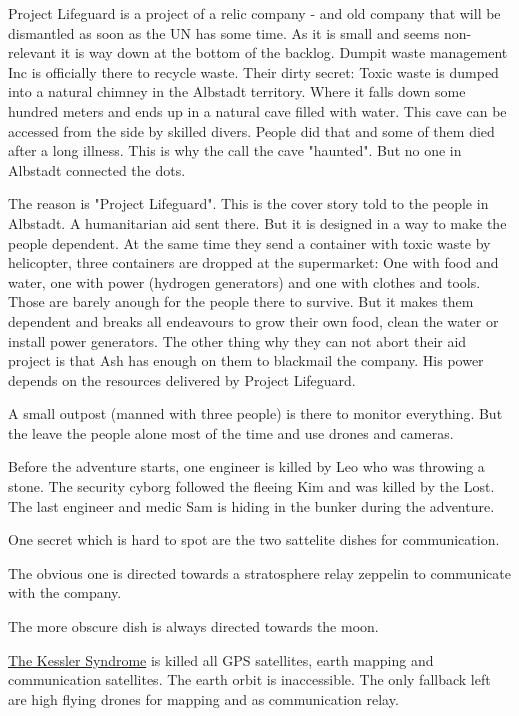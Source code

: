 Project Lifeguard is a project of a relic company - and old company that will be dismantled as soon as the UN has some time. As it is small and seems non-relevant it is way down at the bottom of the backlog.
Dumpit waste management Inc is officially there to recycle waste. Their dirty secret: Toxic waste is dumped into a natural chimney in the Albstadt territory. Where it falls down some hundred meters and ends up in a natural cave filled with water. This cave can be accessed from the side by skilled divers. People did that and some of them died after a long illness. This is why the call the cave "haunted". But no one in Albstadt connected the dots.

The reason is "Project Lifeguard". This is the cover story told to the people in Albstadt. A humanitarian aid sent there. But it is designed in a way to make the people dependent. At the same time they send a container with toxic waste by helicopter, three containers are dropped at the supermarket: One with food and water, one with power (hydrogen generators) and one with clothes and tools.
Those are barely anough for the people there to survive. But it makes them dependent and breaks all endeavours to grow their own food, clean the water or install power generators.
The other thing why they can not abort their aid project is that Ash has enough on them to blackmail the company. His power depends on the resources delivered by Project Lifeguard.

A small outpost (manned with three people) is there to monitor everything. But the leave the people alone most of the time and use drones and cameras.

Before the adventure starts, one engineer is killed by Leo who was throwing a stone. The security cyborg followed the fleeing Kim and was killed by the Lost.
The last engineer and medic Sam is hiding in the bunker during the adventure.

One secret which is hard to spot are the two sattelite dishes for communication.

The obvious one is directed towards a stratosphere relay zeppelin to communicate with the company.

The more obscure dish is always directed towards the moon.

\begin{sidebarBox}[title=Kessler Syndrome]

    \hyperref[sec: sec: Kessler Syndrome]{The Kessler Syndrome} is killed all GPS satellites, earth mapping and communication satellites. The earth orbit is inaccessible. The only fallback left are high flying drones for mapping and as communication relay.
\end{sidebarBox}


